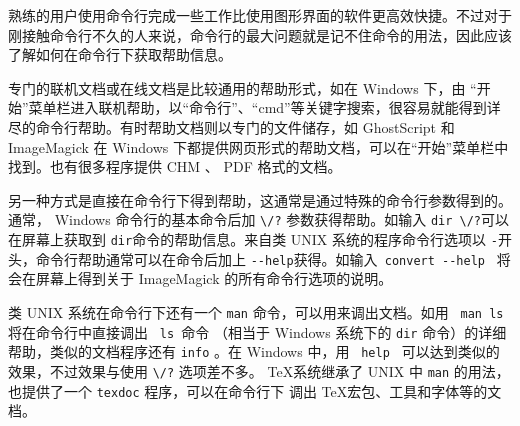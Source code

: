 {
    \qquad 熟练的用户使用命令行完成一些工作比使用图形界面的软件更高效快捷。不过对于刚接触命令行不久的人来说，命令行的最大问题就是记不住命令的用法，因此应该了解如何在命令行下获取帮助信息。

    \qquad 专门的联机文档或在线文档是比较通用的帮助形式，如在 Windows 下，由 “开始”菜单栏进入联机帮助，以“命令行”、“cmd”等关键字搜索，很容易就能得到详尽的命令行帮助。有时帮助文档则以专门的文件储存，如 GhostScript 和 ImageMagick 在 Windows 下都提供网页形式的帮助文档，可以在“开始”菜单栏中找到。也有很多程序提供 CHM 、 PDF 格式的文档。

    \qquad 另一种方式是直接在命令行下得到帮助，这通常是通过特殊的命令行参数得到的。通常， Windows 命令行的基本命令后加 \lstinline{\/?} 参数获得帮助。如输入 \lstinline{dir \/?}可以在屏幕上获取到 \lstinline{dir}命令的帮助信息。来自类 UNIX 系统的程序命令行选项以 \lstinline{-}开头，命令行帮助通常可以在命令后加上 \lstinline{--help}获得。如输入\lstinline{ convert --help } 将会在屏幕上得到关于 ImageMagick 的所有命令行选项的说明。

    \qquad 类 UNIX 系统在命令行下还有一个 \lstinline{man} 命令，可以用来调出文档。如用 \lstinline{ man ls } 将在命令行中直接调出 \lstinline{ ls }命令 （相当于 Windows 系统下的 \lstinline{dir} 命令）的详细帮助，类似的文档程序还有 \lstinline{info} 。在 Windows 中，用 \lstinline{ help } 可以达到类似的效果，不过效果与使用  \lstinline{\/?}  选项差不多。 \TeX 系统继承了 UNIX 中 \lstinline{man} 的用法，也提供了一个 \lstinline{texdoc} 程序，可以在命令行下 调出 \TeX 宏包、工具和字体等的文档。
}